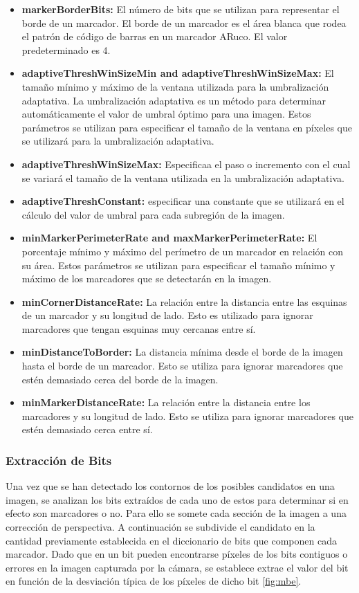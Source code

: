 \begin{itemize}
    \item   \textbf{markerBorderBits:}
    El número de bits que se utilizan para representar el borde de un marcador. El borde de un marcador es el área blanca que rodea el patrón de código de barras en un marcador ARuco. El valor predeterminado es 4.
    \item \textbf{adaptiveThreshWinSizeMin and adaptiveThreshWinSizeMax:}
    El tamaño mínimo y máximo de la ventana utilizada para la umbralización adaptativa. La umbralización adaptativa es un método para determinar automáticamente el valor de umbral óptimo para una imagen. Estos parámetros se utilizan para especificar el tamaño de la ventana en píxeles que se utilizará para la umbralización adaptativa.
    \item \textbf{adaptiveThreshWinSizeMax:}
    Especificaa el paso o incremento con el cual se variará el tamaño de la ventana utilizada en la umbralización adaptativa.
    \item \textbf{adaptiveThreshConstant:}
    especificar una constante que se utilizará en el cálculo del valor de umbral para cada subregión de la imagen.
    \item \textbf{minMarkerPerimeterRate and maxMarkerPerimeterRate:}
    El porcentaje mínimo y máximo del perímetro de un marcador en relación con su área. Estos parámetros se utilizan para especificar el tamaño mínimo y máximo de los marcadores que se detectarán en la imagen.
    \item \textbf{minCornerDistanceRate:}
    La relación entre la distancia entre las esquinas de un marcador y su longitud de lado. Esto es utilizado para ignorar marcadores que tengan esquinas muy cercanas entre sí.
    \item \textbf{minDistanceToBorder:}
    La distancia mínima desde el borde de la imagen hasta el borde de un marcador. Esto se utiliza para ignorar marcadores que estén demasiado cerca del borde de la imagen.
    \item \textbf{ minMarkerDistanceRate:}
    La relación entre la distancia entre los marcadores y su longitud de lado. Esto se utiliza para ignorar marcadores que estén demasiado cerca entre sí.
\end{itemize}

\subsubsection*{Extracción de Bits}
Una vez que se han detectado los contornos de los posibles candidatos en una imagen, se analizan los bits extraídos de cada uno de estos para determinar si en efecto son marcadores o no.
Para ello se somete cada sección de la imagen a una corrección de perspectiva. A continuación se subdivide el candidato en la cantidad previamente establecida en el diccionario de bits que componen cada marcador. Dado que en un bit pueden encontrarse píxeles de los bits contiguos o errores en la imagen capturada por la cámara, se establece extrae el valor del bit en función de la desviación típica de los píxeles de dicho bit \ref{fig:mbe}.

